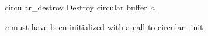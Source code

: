 \begin{DoxyDocu}{circular\_destroy}
\label{circular_8h_add0c91d4bec47d2d74394c1772d2d9d0_add0c91d4bec47d2d74394c1772d2d9d0}
Destroy circular buffer {\itshape c}.

{\itshape c} must have been initialized with a call to \hyperlink{circular_8h_abd02fffdac28d268a37c6bfd5c6e2fb5_abd02fffdac28d268a37c6bfd5c6e2fb5}{circular\_init}

\end{DoxyDocu}
